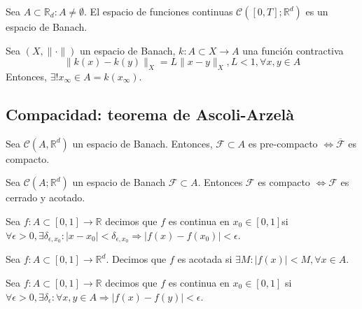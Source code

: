 \begin{theo}
  Sea $A \subset \mathbb{R}_{d}: A \neq \emptyset$. El espacio de funciones continuas $\mathcal{C}([0,T];\mathbb{R}^d)$ es un espacio de Banach.
\end{theo}

\begin{theo}
  Sea $(X, \| \cdot \|)$ un espacio de Banach, $k: A \subset X \to A$ una función contractiva
  \[ 
    \| k(x) - k(y) \|_{X} = L \| x -  y \|_{X}, L < 1, \forall x,y \in A
  \] 
  Entonces, $\exists ! x_{\infty} \in A = k(x_{\infty})$.
\end{theo}

\subsection{Compacidad: teorema de Ascoli-Arzelà}

\begin{prop}
  Sea $\mathcal{C}(A,\mathbb{R}^{d})$ un espacio de Banach. Entonces, $\mathcal{F} \subset A$ es pre-compacto $\Leftrightarrow \overline{\mathcal{F}}$ es compacto.
\end{prop}

\begin{theo}
  Sea $\mathcal{C}(A;\mathbb{R}^{d})$ un espacio de Banach $\mathcal{F} \subset A$. Entonces $\mathcal{F}$ es compacto $\Leftrightarrow \mathcal{F}$ es cerrado y acotado.
\end{theo}

\begin{defn}
  Sea $f: A \subset [0,1] \to \mathbb{R}$ decimos que $f$ es continua en $x_{0} \in [0,1]$si $\forall \epsilon > 0, \exists \delta_{\epsilon, x_{0}}: |x - x_{0}|< \delta_{\epsilon, x_{0}} \Rightarrow |f(x) - f(x_{0} )|<\epsilon$.
\end{defn}

\begin{defn}
  Sea $f: A \subset [0,1] \to \mathbb{R}^{d}$. Decimos que $f$ es acotada si $\exists M: |f(x)|<M, \forall x \in A$.
\end{defn}

\begin{defn}
    Sea $f: A \subset [0,1] \to \mathbb{R}$ decimos que $f$ es continua en $x_{0} \in [0,1]$ si $\forall \epsilon > 0, \exists \delta_{\epsilon}: \forall x,y \in A \Rightarrow |f(x) - f(y)|<\epsilon$.
\end{defn}

